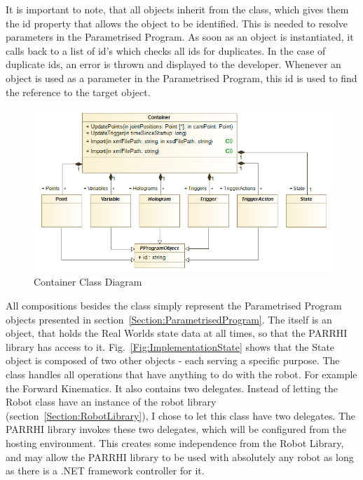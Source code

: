 It is important to note, that all objects inherit from the  class, which gives them the id property that allows the object to be identified. This is needed to resolve parameters in the Parametrised Program. As soon as an object is instantiated, it calls back to a list of id's which checks all ids for duplicates. In the case of duplicate ids, an error is thrown and displayed to the developer. Whenever an object is used as a parameter in the Parametrised Program, this id is used to find the reference to the target object.

\begin{figure}[!h]
	\centering
	\includegraphics[width=1\linewidth]{Figures/Implementation_Container}
	\caption[Container Class Diagram]{Container Class Diagram}
	\label{Fig:ImplementationContainer}
\end{figure}

All compositions besides the  class simply represent the Parametrised Program objects presented in section~\ref{Section:ParametrisedProgram}. The  itself is an object, that holds the Real Worlds state data at all times, so that the PARRHI library has access to it. Fig.~\ref{Fig:ImplementationState} shows that the State object is composed of two other objects - each serving a specific purpose. The  class handles all operations that have anything to do with the robot. For example the Forward Kinematics. It also contains two delegates. Instead of letting the Robot class have an instance of the robot library (section~\ref{Section:RobotLibrary}), I chose to let this class have two delegates. The PARRHI library invokes these two delegates, which will be configured from the hosting environment. This creates some independence from the Robot Library, and may allow the PARRHI library to be used with absolutely any robot as long as there is a .NET framework controller for it.

